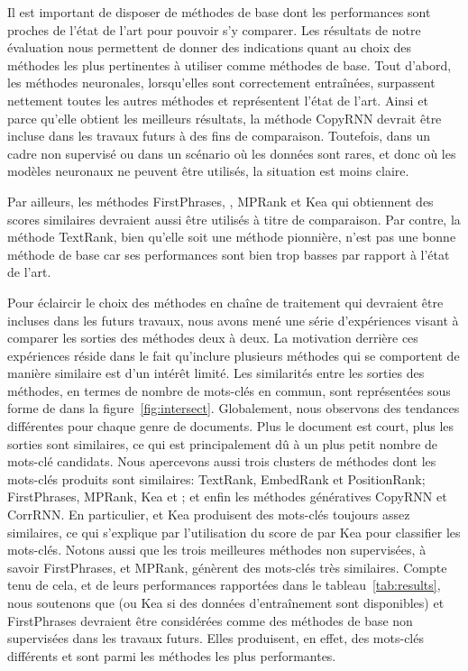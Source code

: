 


Il est important de disposer de méthodes de base dont les performances sont proches de l'état de l'art pour pouvoir s'y comparer.
Les résultats de notre évaluation nous permettent de donner des indications quant au choix des méthodes les plus pertinentes à utiliser comme méthodes de base.
Tout d'abord, les méthodes neuronales, lorsqu'elles sont correctement entraînées, surpassent nettement toutes les autres méthodes et représentent l'état de l'art.
Ainsi et parce qu'elle obtient les meilleurs résultats, la méthode CopyRNN devrait être incluse dans les travaux futurs à des fins de comparaison.
Toutefois, dans un cadre non supervisé ou dans un scénario où les données sont rares, et donc où les modèles neuronaux ne peuvent être utilisés, la situation est moins claire.

Par ailleurs, les méthodes FirstPhrases, \tfidf{}, MPRank et Kea qui obtiennent des scores similaires devraient aussi être utilisés à titre de comparaison.
Par contre, la méthode TextRank, bien qu'elle soit une méthode pionnière, n'est pas une bonne méthode de base car ses performances sont bien trop basses par rapport à l'état de l'art.

Pour éclaircir le choix des méthodes en chaîne de traitement qui devraient être incluses dans les futurs travaux, nous avons mené une série d'expériences visant à comparer les sorties des méthodes deux à deux.
La motivation derrière ces expériences réside dans le fait qu'inclure plusieurs méthodes qui se comportent de manière similaire est d'un intérêt limité.
Les similarités entre les sorties des méthodes, en termes de nombre de mots-clés en commun, sont représentées sous forme de  dans la figure~\ref{fig:intersect}.
Globalement, nous observons des tendances différentes pour chaque genre de documents.
Plus le document est court, plus les sorties sont similaires, ce qui est principalement dû à un plus petit nombre de mots-clé candidats.
Nous apercevons aussi trois clusters de méthodes dont les mots-clés produits sont similaires: TextRank, EmbedRank et PositionRank; FirstPhrases, MPRank, Kea et \tfidf{}; et enfin les méthodes génératives CopyRNN et CorrRNN.
En particulier, \tfidf{} et Kea produisent des mots-clés toujours assez similaires, ce qui s'explique par l'utilisation du score de \tfidf{} par Kea pour classifier les mots-clés.
Notons aussi que les trois meilleures méthodes non supervisées, à savoir FirstPhrases, \tfidf{} et MPRank, génèrent des mots-clés très similaires.
Compte tenu de cela, et de leurs performances rapportées dans le tableau~\ref{tab:results}, nous soutenons que \tfidf{} (ou Kea si des données d'entraînement sont disponibles) et FirstPhrases devraient être considérées comme des méthodes de base non supervisées dans les travaux futurs. Elles produisent, en effet, des mots-clés différents et sont parmi les méthodes les plus performantes.

